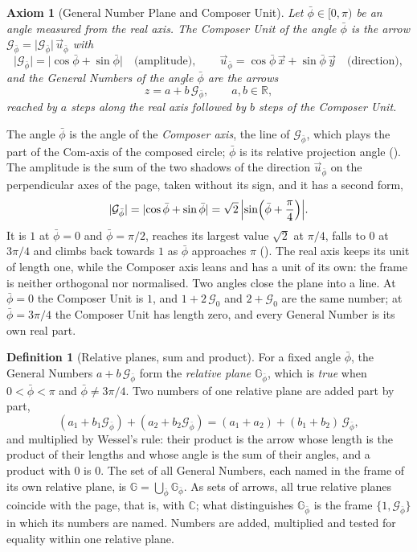 \documentclass[11pt,a4paper]{amsart}
\theoremstyle{plain}
\newtheorem{axiom}[theorem]{Axiom}
\theoremstyle{definition}
\newtheorem{definition}[theorem]{Definition}
\theoremstyle{remark}
\newcommand{\pb}{\bar{\phi}}                     %
\newcommand{\Gp}{\mathcal{G}_{\bar{\phi}}}       %
\newcommand{\up}{\vec{u}_{\bar{\phi}}}           %
\newcommand{\GN}{\mathbb{G}}                     %
\newcommand{\GNp}{\mathbb{G}_{\bar{\phi}}}       %
\newcommand{\C}{\mathbb{C}}
\newcommand{\R}{\mathbb{R}}
\begin{document}
\begin{axiom}[General Number Plane and Composer Unit]\label{ax:gn}
Let $\pb \in [0, \pi)$ be an angle measured from the real axis. The \emph{Composer Unit} of the angle $\pb$ is the arrow $\Gp = \lvert\Gp\rvert\,\up$ with
\[
\lvert\Gp\rvert = \lvert\cos\pb + \sin\pb\rvert \quad \text{(amplitude)} , \qquad \up = \cos\pb\,\vec{x} + \sin\pb\,\vec{y} \quad \text{(direction)} ,
\]
and the \emph{General Numbers} of the angle $\pb$ are the arrows
\[
z = a + b\,\Gp , \qquad a, b \in \R ,
\]
reached by $a$ steps along the real axis followed by $b$ steps of the Composer Unit.
\end{axiom}

The angle $\pb$ is the angle of the \emph{Composer axis}, the line of $\Gp$, which plays the part of the Com-axis of the composed circle; $\pb$ is its relative projection angle (). The amplitude is the sum of the two shadows of the direction $\up$ on the perpendicular axes of the page, taken without its sign, and it has a second form,
\[
\lvert\Gp\rvert = \lvert\cos\pb + \sin\pb\rvert = \sqrt{2}\,\Bigl\lvert\sin\Bigl(\pb + \frac{\pi}{4}\Bigr)\Bigr\rvert .
\]
It is $1$ at $\pb = 0$ and $\pb = \pi/2$, reaches its largest value $\sqrt{2}$ at $\pi/4$, falls to $0$ at $3\pi/4$ and climbs back towards $1$ as $\pb$ approaches $\pi$ (). The real axis keeps its unit of length one, while the Composer axis leans and has a unit of its own: the frame is neither orthogonal nor normalised. Two angles close the plane into a line. At $\pb = 0$ the Composer Unit is $1$, and $1 + 2\,\mathcal{G}_0$ and $2 + \mathcal{G}_0$ are the same number; at $\pb = 3\pi/4$ the Composer Unit has length zero, and every General Number is its own real part.

\begin{definition}[Relative planes, sum and product]\label{def:relative-plane}
For a fixed angle $\pb$, the General Numbers $a + b\,\Gp$ form the \emph{relative plane} $\GNp$, which is \emph{true} when $0 < \pb < \pi$ and $\pb \neq 3\pi/4$. Two numbers of one relative plane are added part by part,
\[
(a_1 + b_1\Gp) + (a_2 + b_2\Gp) = (a_1 + a_2) + (b_1 + b_2)\,\Gp ,
\]
and multiplied by Wessel's rule: their product is the arrow whose length is the product of their lengths and whose angle is the sum of their angles, and a product with $0$ is $0$. The set of all General Numbers, each named in the frame of its own relative plane, is $\GN = \bigcup_{\pb} \GNp$. As sets of arrows, all true relative planes coincide with the page, that is, with $\C$; what distinguishes $\GNp$ is the frame $\{1, \Gp\}$ in which its numbers are named. Numbers are added, multiplied and tested for equality within one relative plane.
\end{definition}
\end{document}
